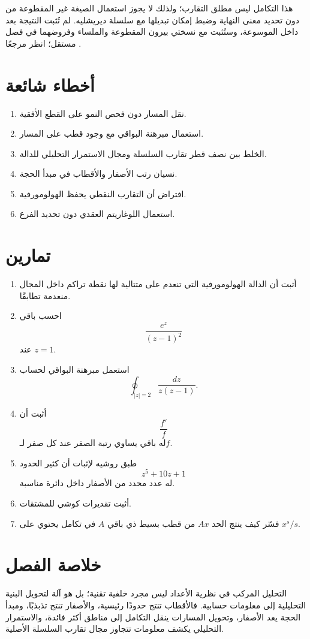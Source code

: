 هذا التكامل ليس مطلق التقارب؛ ولذلك لا يجوز استعمال الصيغة غير المقطوعة
من دون تحديد معنى النهاية وضبط إمكان تبديلها مع سلسلة ديريشليه. لم
تُثبت النتيجة بعد داخل الموسوعة، وستُثبت مع نسختي بيرون المقطوعة
والملساء وفروضهما في فصل مستقل؛ انظر مرجعًا \cite{Titchmarsh1986}.

\section{أخطاء شائعة}

\begin{enumerate}
  \item نقل المسار دون فحص النمو على القطع الأفقية.
  \item استعمال مبرهنة البواقي مع وجود قطب على المسار.
  \item الخلط بين نصف قطر تقارب السلسلة ومجال الاستمرار التحليلي للدالة.
  \item نسيان رتب الأصفار والأقطاب في مبدأ الحجة.
  \item افتراض أن التقارب النقطي يحفظ الهولومورفية.
  \item استعمال اللوغاريتم العقدي دون تحديد الفرع.
\end{enumerate}

\section{تمارين}

\begin{enumerate}
  \item أثبت أن الدالة الهولومورفية التي تنعدم على متتالية لها نقطة تراكم داخل المجال منعدمة تطابقًا.
  \item احسب باقي
  \[
  \frac{e^z}{(z-1)^2}
  \]
  عند \(z=1\).
  \item استعمل مبرهنة البواقي لحساب
  \[
  \oint_{|z|=2}\frac{dz}{z(z-1)}.
  \]
  \item أثبت أن
  \[
  \frac{f'}{f}
  \]
  له باقي يساوي رتبة الصفر عند كل صفر لـ\(f\).
  \item طبق روشيه لإثبات أن كثير الحدود
  \[
  z^5+10z+1
  \]
  له عدد محدد من الأصفار داخل دائرة مناسبة.
  \item أثبت تقديرات كوشي للمشتقات.
  \item فسّر كيف ينتج الحد \(Ax\) من قطب بسيط ذي باقي \(A\) في تكامل يحتوي على \(x^s/s\).
\end{enumerate}

\section{خلاصة الفصل}

التحليل المركب في نظرية الأعداد ليس مجرد خلفية تقنية؛ بل هو آلة لتحويل البنية التحليلية إلى معلومات حسابية. فالأقطاب تنتج حدودًا رئيسية، والأصفار تنتج تذبذبًا، ومبدأ الحجة يعد الأصفار، وتحويل المسارات ينقل التكامل إلى مناطق أكثر فائدة، والاستمرار التحليلي يكشف معلومات تتجاوز مجال تقارب السلسلة الأصلية.
